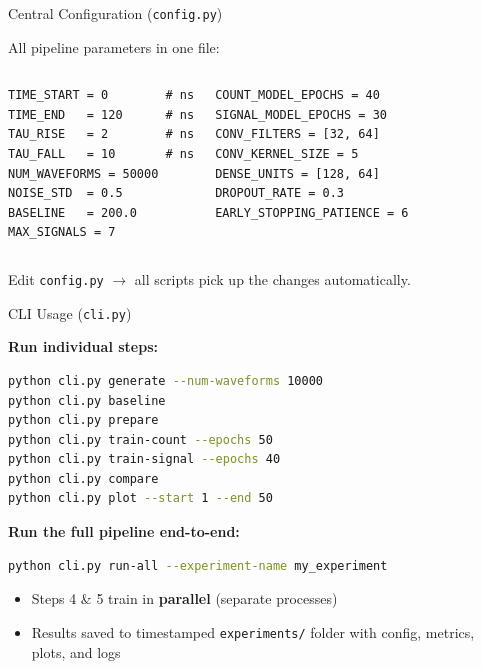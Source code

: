 \documentclass[aspectratio=169]{beamer}
\begin{document}
\begin{frame}[fragile]{Central Configuration (\texttt{config.py})}

All pipeline parameters in one file:

\medskip
\begin{columns}[T]
\begin{lstlisting}[title={\scriptsize Physics \& Generation}]
TIME_START = 0        # ns
TIME_END   = 120      # ns
TAU_RISE   = 2        # ns
TAU_FALL   = 10       # ns
NUM_WAVEFORMS = 50000
NOISE_STD  = 0.5
BASELINE   = 200.0
MAX_SIGNALS = 7
\end{lstlisting}

\begin{lstlisting}[title={\scriptsize Training \& Architecture}]
COUNT_MODEL_EPOCHS = 40
SIGNAL_MODEL_EPOCHS = 30
CONV_FILTERS = [32, 64]
CONV_KERNEL_SIZE = 5
DENSE_UNITS = [128, 64]
DROPOUT_RATE = 0.3
EARLY_STOPPING_PATIENCE = 6
\end{lstlisting}
\end{columns}

\medskip
\begin{center}
\small Edit \texttt{config.py} $\rightarrow$ all scripts pick up the changes automatically.
\end{center}
\end{frame}

\begin{frame}[fragile]{CLI Usage (\texttt{cli.py})}

\textbf{Run individual steps:}
\begin{lstlisting}[language=bash]
python cli.py generate --num-waveforms 10000
python cli.py baseline
python cli.py prepare
python cli.py train-count --epochs 50
python cli.py train-signal --epochs 40
python cli.py compare
python cli.py plot --start 1 --end 50
\end{lstlisting}

\medskip
\textbf{Run the full pipeline end-to-end:}
\begin{lstlisting}[language=bash]
python cli.py run-all --experiment-name my_experiment
\end{lstlisting}

\smallskip
\begin{itemize}
  \item Steps 4 \& 5 train in \textbf{parallel} (separate processes)
  \item Results saved to timestamped \texttt{experiments/} folder with config, metrics, plots, and logs
\end{itemize}
\end{frame}
\end{document}
